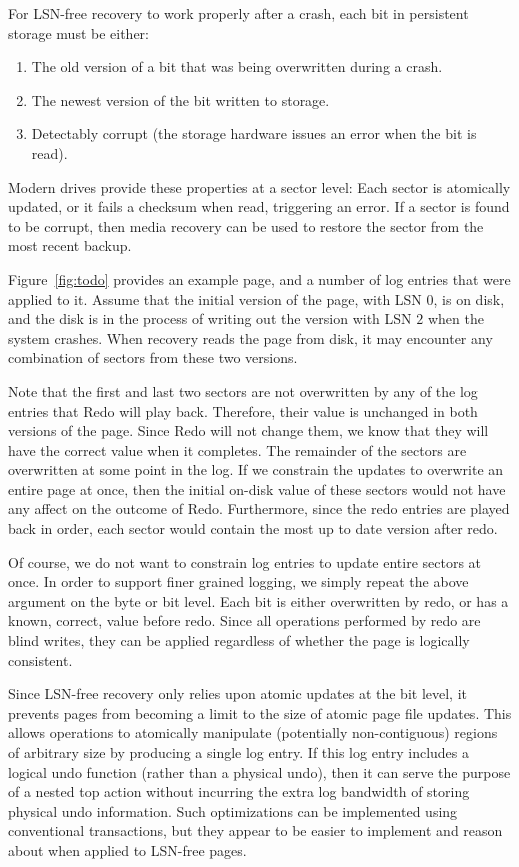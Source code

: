 \documentclass[letterpaper,twocolumn,10pt]{article}
\begin{document}
For LSN-free recovery to work properly after a crash, each bit in
persistent storage must be either:

\begin{enumerate}
\item The old version of a bit that was being overwritten during a crash.
\item The newest version of the bit written to storage.
\item Detectably corrupt (the storage hardware issues an error when the
  bit is read).
\end{enumerate}

Modern drives provide these properties at a sector level: Each sector
is atomically updated, or it fails a checksum when read, triggering an
error.  If a sector is found to be corrupt, then media recovery can be
used to restore the sector from the most recent backup.

Figure~\ref{fig:todo} provides an example page, and a number of log
entries that were applied to it.  Assume that the initial version of
the page, with LSN $0$, is on disk, and the disk is in the process of
writing out the version with LSN $2$ when the system crashes.  When
recovery reads the page from disk, it may encounter any combination of
sectors from these two versions.

Note that the first and last two sectors are not overwritten by any
of the log entries that Redo will play back.  Therefore, their value
is unchanged in both versions of the page.  Since Redo will not change
them, we know that they will have the correct value when it completes.
The remainder of the sectors are overwritten at some point in the log.
If we constrain the updates to overwrite an entire page at once, then
the initial on-disk value of these sectors would not have any affect
on the outcome of Redo.  Furthermore, since the redo entries are
played back in order, each sector would contain the most up to date
version after redo.

Of course, we do not want to constrain log entries to update entire
sectors at once.  In order to support finer grained logging, we simply
repeat the above argument on the byte or bit level.  Each bit is
either overwritten by redo, or has a known, correct, value before
redo.  Since all operations performed by redo are blind writes, they
can be applied regardless of whether the page is logically consistent.

Since LSN-free recovery only relies upon atomic updates at the bit
level, it prevents pages from becoming a limit to the size of atomic
page file updates.  This allows operations to atomically manipulate
(potentially non-contiguous) regions of arbitrary size by producing a
single log entry.  If this log entry includes a logical undo function
(rather than a physical undo), then it can serve the purpose of a
nested top action without incurring the extra log bandwidth of storing
physical undo information.  Such optimizations can be implemented
using conventional transactions, but they appear to be easier to
implement and reason about when applied to LSN-free pages.
\end{document}
